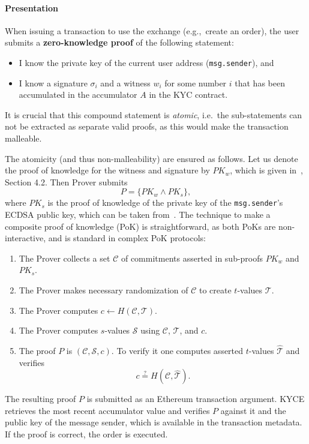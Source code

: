 \paragraph{Presentation} 
When issuing a transaction to use the exchange (e.g.,~create an order), the user submits a \textbf{zero-knowledge proof} of the following statement:
\begin{itemize}
	\item I know the private key of the current user address (\texttt{msg.sender}), and
	\item I know a signature $\sigma_i$ and a witness $w_i$ for some number $i$ that has been accumulated in the
	accumulator $A$ in the KYC contract.
\end{itemize}
It is crucial that this compound statement is \textit{atomic}, i.e.~the sub-statements can not be extracted as separate valid proofs, as this would make the transaction malleable.

The atomicity (and thus non-malleability) are ensured as follows.
Let us denote the proof of knowledge for the witness and signature by $PK_w$, which is given in~\cite{Camenisch2009}, Section 4.2.
Then Prover submits 
$$
P = \{PK_w \wedge PK_s\},
$$
where $PK_s$ is the proof of knowledge of the private key of the \texttt{msg.sender}'s ECDSA public key, which can be taken from~\cite{Chase2016}.
The technique to make a composite proof of knowledge (PoK) is straightforward, as both PoKs are non-interactive, and is standard in complex PoK protocols:
\begin{enumerate}
	\item The Prover collects a set $\mathcal{C}$ of commitments asserted in sub-proofs $PK_w$ and $PK_s$.
	\item The Prover makes necessary randomization of $\mathcal{C}$ to create $t$-values $\mathcal{T}$.
	\item The Prover computes $c \leftarrow H(\mathcal{C},\mathcal{T})$.
	\item The Prover computes $s$-values $\mathcal{S}$ using
	$\mathcal{C}$, $\mathcal{T}$, and $c$.
	\item The proof $P$ is $(\mathcal{C}, \mathcal{S},c)$.
	To verify it one computes asserted $t$-values $\widehat{\mathcal{T}}$ and verifies
	$$
	c\overset{?}{=}H(\mathcal{C},\widehat{\mathcal{T}}).
	$$
\end{enumerate}

The resulting proof $P$ is submitted as an Ethereum transaction argument.
KYCE retrieves the most recent accumulator value and verifies $P$ against it and the public key of the message sender, which is available in the transaction metadata.
If the proof is correct, the order is executed.


